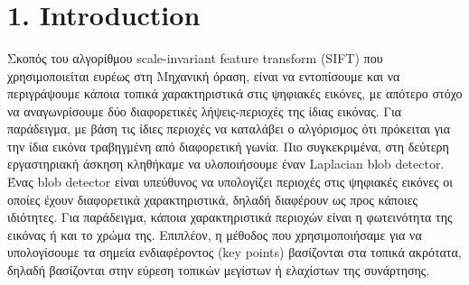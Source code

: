 \documentclass{article}
\newcommand{\tl}[1]{\textlatin{#1}}
\begin{document}
\begin{titlepage}
		\begin{minipage}{0.6\textwidth}
			
			\begin{flushright} \large
				\theauthor\\
				
			\end{flushright}
			
			\begin{flushright} \large
				\tl{\thedate}\\
				
			\end{flushright}
			
		\end{minipage}\\[2 cm]
		
	\end{titlepage}	
	\newpage
	
	\section*{1. \tl{Introduction}}
	Σκοπός του αλγορίθμου \tl{scale-invariant feature transform (SIFT)} που χρησιμοποιείται ευρέως στη Μηχανική όραση, είναι να εντοπίσουμε και να περιγράψουμε κάποια τοπικά 
	χαρακτηριστικά στις ψηφιακές εικόνες, με απότερο στόχο να αναγωνρίσουμε δύο διαφορετικές λήψεις-περιοχές της ίδιας εικόνας. Για παράδειγμα, με βάση τις ίδιες περιοχές να 
	καταλάβει ο αλγόρισμος ότι πρόκειται για την ίδια εικόνα τραβηγμένη από διαφορετική γωνία. Πιο συγκεκριμένα, στη δεύτερη εργαστηριακή άσκηση κληθήκαμε να υλοποιήσουμε έναν \tl{Laplacian blob detector}. Ένας \tl{blob detector}
	είναι υπεύθυνος να υπολογίζει περιοχές στις ψηφιακές εικόνες οι οποίες έχουν διαφορετικά χαρακτηριστικά, δηλαδή διαφέρουν ως προς κάποιες ιδιότητες. Για παράδειγμα, κάποια 
	χαρακτηριστικά περιοχών είναι η φωτεινότητα της εικόνας ή και το χρώμα της. Επιπλέον, η μέθοδος που χρησιμοποιήσαμε για να υπολογίσουμε τα σημεία ενδιαφέροντος \tl{(key points)} 
	βασίζονται στα τοπικά ακρότατα, δηλαδή βασίζονται στην εύρεση τοπικών μεγίστων ή ελαχίστων της συνάρτησης.

	\ \\\\\\
\end{document}
